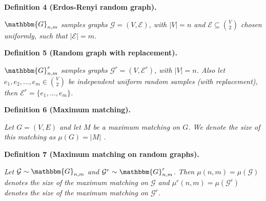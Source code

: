 

\par\medskip\noindent\textbf{\textbf{Definition 4}\textbf{ }(Erdos-Renyi random graph)\textbf{.}}\par



$\mathbbm{G}_{n,m}$\emph{ samples graphs $\mathcal{G}=(V,\mathcal{E})$, with $|V|=n$ and $\mathcal{E}\subseteq\binom{V}{2}$ chosen uniformly, such that $|\mathcal{E}|=m$.}\par







\par\medskip\noindent\textbf{\textbf{Definition 5}\textbf{ }(Random graph with replacement)\textbf{.}}\par



$\mathbbm{G}^{r}_{n,m}$\emph{ samples graphs $\mathcal{G}^{r}=(V,\mathcal{E}^{r})$, with $|V|=n$. Also let $e_{1},e_{2},\dots,e_{m}\in\binom{V}{2}$ be independent uniform random samples (with replacement), then $\mathcal{E}^{r}=\{e_{1},\dots,e_{m}\}$.}\par







\par\medskip\noindent\textbf{\textbf{Definition 6}\textbf{ }(Maximum matching)\textbf{.}}\par



\emph{Let $G=(V,E)$ and let $M$ be a maximum matching on $G$. We denote the size of this matching as $\mu(G)=|M|$ .}\par







\par\medskip\noindent\textbf{\textbf{Definition 7}\textbf{ }(Maximum matching on random graphs)\textbf{.}}\par



\emph{Let $\mathcal{G}\sim\mathbbm{G}_{n,m}$ and $\mathcal{G}^{r}\sim\mathbbm{G}^{r}_{n,m}$.
Then $\mu(n,m)=\mu(\mathcal{G})$ denotes the size of the maximum matching on $\mathcal{G}$ and $\mu^{r}(n,m)=\mu(\mathcal{G}^{r})$ denotes the size of the maximum matching on $\mathcal{G}^{r}$.}\par



